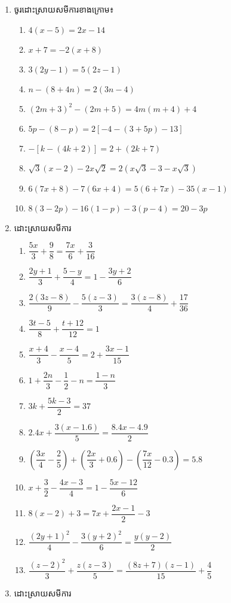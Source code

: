 \begin{enumerate}
\item ចូរដោះស្រាយសមីការខាងក្រោម៖
\begin{enumerate}[label=\alph*.]
\item $4(x-5)=2x-14$
\item $x+7=-2(x+8)$
\item $3(2y-1)=5(2z-1)$
\item $n-(8+4n)=2(3n-4)$
\item $(2m+3)^2-(2m+5)=4m(m+4)+4$
\item $5p-(8-p)=2\left[-4-(3+5p)-13\right]$
\item $-\left[k-(4k+2)\right]=2+(2k+7)$
\item $\sqrt{3}(x-2)-2x\sqrt{2}=2(x\sqrt{3}-3-x\sqrt{3})$
\item $6(7x+8)-7(6x+4)=5(6+7x)-35(x-1)$
\item $8(3-2p)-16(1-p)-3(p-4)=20-3p$
\end{enumerate}

\item  ដោះស្រាយសមីការ
\begin{enumerate}[label=\alph*.]
\item $\dfrac{5x}{3}+\dfrac{9}{8}=\dfrac{7x}{6}+\dfrac{3}{16}$
\item $\dfrac{2y+1}{3}+\dfrac{5-y}{4}=1-\dfrac{3y+2}{6}$
\item $\dfrac{2(3z-8)}{9}-\dfrac{5(z-3)}{3}=\dfrac{3(z-8)}{4}+\dfrac{17}{36}$
\item $\dfrac{3t-5}{8}+\dfrac{t+12}{12}=1$
\item $\dfrac{x+4}{3}-\dfrac{x-4}{5}=2+\dfrac{3x-1}{15}$
\item $1+\dfrac{2n}{3}-\dfrac{1}{2}-n=\dfrac{1-n}{3}$
\item $3k+\dfrac{5k-3}{2}=37$
\item $2.4x+\dfrac{3(x-1.6)}{5}=\dfrac{8.4x-4.9}{2}$
\item $\left(\dfrac{3x}{4}-\dfrac{2}{5}\right)+\left(\dfrac{2x}{3}+0.6\right)-\left(\dfrac{7x}{12}-0.3\right)=5.8$
\item $x+\dfrac{3}{2}-\dfrac{4x-3}{4}=1-\dfrac{5x-12}{6}$
\item $8(x-2)+3=7x+\dfrac{2x-1}{2}-3$
\item $\dfrac{(2y+1)^2}{4}-\dfrac{3(y+2)^2}{6}=\dfrac{y(y-2)}{2}$
\item $\dfrac{(z-2)^2}{3}+\dfrac{z(z-3)}{5}=\dfrac{(8z+7)(z-1)}{15}+\dfrac{4}{5}$
\end{enumerate}

\item  ដោះស្រាយសមីការ
\begin{enumerate}[label=\alph*.]
\end{enumerate}


\end{enumerate}
